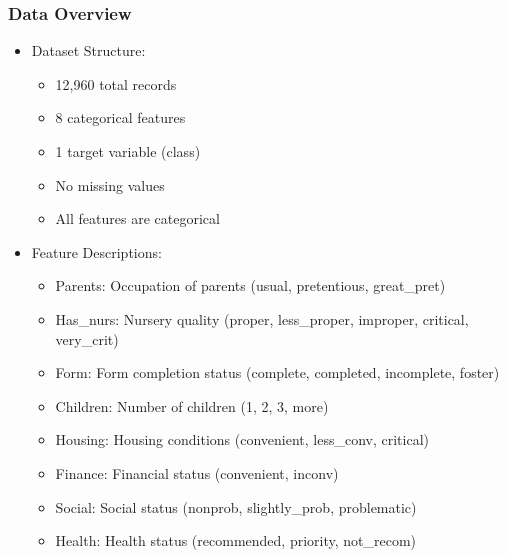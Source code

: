 \subsubsection{Data Overview}
\begin{itemize}
    \item Dataset Structure:
    \begin{itemize}
        \item 12,960 total records
        \item 8 categorical features
        \item 1 target variable (class)
        \item No missing values
        \item All features are categorical
    \end{itemize}
    
    \item Feature Descriptions:
    \begin{itemize}
        \item Parents: Occupation of parents (usual, pretentious, great\_pret)
        \item Has\_nurs: Nursery quality (proper, less\_proper, improper, critical, very\_crit)
        \item Form: Form completion status (complete, completed, incomplete, foster)
        \item Children: Number of children (1, 2, 3, more)
        \item Housing: Housing conditions (convenient, less\_conv, critical)
        \item Finance: Financial status (convenient, inconv)
        \item Social: Social status (nonprob, slightly\_prob, problematic)
        \item Health: Health status (recommended, priority, not\_recom)
    \end{itemize}
\end{itemize}

